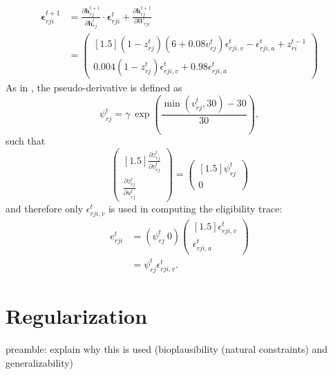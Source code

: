 	        \begin{align}
	        \mathbf{\epsilon}^{t+1}_{rji} &= \frac{\partial\mathbf{h}^{t+1}_{rj}}{\partial\mathbf{h}^t_{rj}}\cdot\mathbf{\epsilon}^t_{rji} + \frac{\partial\mathbf{h}^{t+1}_{rj}}{\partial W_{rji}}\\
	        &= \begin{pmatrix}[1.5]
	        \left(1-z^t_{rj}\right)\left(6+0.08v^t_{rj}\right)\epsilon^t_{rji, v} -\epsilon^t_{rji, a} + z_{ri}^{t-1}\\
	        0.004\left(1-z^t_{rj}\right)\epsilon^t_{rji, v} + 0.98\epsilon^t_{rji, a}
	        \end{pmatrix}\label{eq:ml_izhikevich_evector}
	        \end{align}
	        As in \cite{traub2020learning}, the pseudo-derivative is defined as
	        \begin{equation}
	        \psi^t_{rj} = \gamma\ \exp\left(\frac{\min\left(v^t_{rj}, 30\right) - 30}{30}\right),
	        \end{equation}
	        such that
	        \begin{equation}
	        \begin{pmatrix}[1.5]\frac{\partial z^t_{rj}}{\partial v^t_{rj}}\\\frac{\partial z^t_{rj}}{\partial u^t_{rj}}\end{pmatrix}
	        = \begin{pmatrix}[1.5]\psi^t_{rj}\\0\end{pmatrix}
	        \end{equation}
	        and therefore only $\epsilon^t_{rji, v}$ is used in computing the eligibility trace:
	        \begin{align}
	        e^t_{rji} &= \left(\psi^t_{rj}\ 0\right)\begin{pmatrix}[1.5]\epsilon^t_{rji, v}\\\epsilon^t_{rji, a}\end{pmatrix} \\
	        &= \psi^t_{rj}\epsilon^t_{rji, v}.
	        \end{align}



\section{Regularization}

	\begin{tcolorbox}[colback=orange]
	preamble: explain why this is used (bioplausibility (natural constraints) and generalizability)
	\end{tcolorbox}

